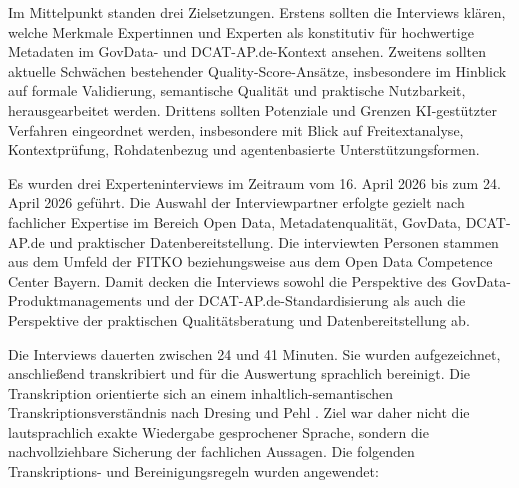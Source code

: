 Im Mittelpunkt standen drei Zielsetzungen. Erstens sollten die Interviews klären, welche Merkmale Expertinnen und Experten als konstitutiv für hochwertige Metadaten im GovData- und DCAT-AP.de-Kontext ansehen. Zweitens sollten aktuelle Schwächen bestehender Quality-Score-Ansätze, insbesondere im Hinblick auf formale Validierung, semantische Qualität und praktische Nutzbarkeit, herausgearbeitet werden. Drittens sollten Potenziale und Grenzen KI-gestützter Verfahren eingeordnet werden, insbesondere mit Blick auf Freitextanalyse, Kontextprüfung, Rohdatenbezug und agentenbasierte Unterstützungsformen.

Es wurden drei Experteninterviews im Zeitraum vom 16. April 2026 bis zum 24. April 2026 geführt. Die Auswahl der Interviewpartner erfolgte gezielt nach fachlicher Expertise im Bereich Open Data, Metadatenqualität, GovData, DCAT-AP.de und praktischer Datenbereitstellung. Die interviewten Personen stammen aus dem Umfeld der FITKO beziehungsweise aus dem Open Data Competence Center Bayern. Damit decken die Interviews sowohl die Perspektive des GovData-Produktmanagements und der DCAT-AP.de-Standardisierung als auch die Perspektive der praktischen Qualitätsberatung und Datenbereitstellung ab.

Die Interviews dauerten zwischen 24 und 41 Minuten. Sie wurden aufgezeichnet, anschließend transkribiert und für die Auswertung sprachlich bereinigt. Die Transkription orientierte sich an einem inhaltlich-semantischen Transkriptionsverständnis nach Dresing und Pehl \parencite{DresingPehl2018}. Ziel war daher nicht die lautsprachlich exakte Wiedergabe gesprochener Sprache, sondern die nachvollziehbare Sicherung der fachlichen Aussagen. Die folgenden Transkriptions- und Bereinigungsregeln wurden angewendet:


